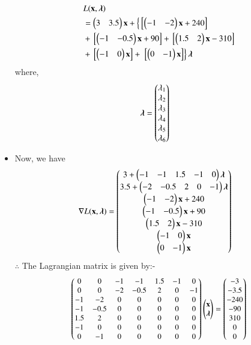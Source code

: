 \begin{itemize}
\begin{equation}
\begin{aligned}
    &L(\mathbf{x},\boldsymbol{\lambda}) \\ &= \begin{pmatrix}3 & 3.5\end{pmatrix}\mathbf{x}+\left\{{}\left[\begin{pmatrix}-1 & -2\end{pmatrix}\mathbf{x}+240\right]\right. \\ &+ {}\left[\begin{pmatrix}-1 & -0.5\end{pmatrix}\mathbf{x}+90\right] +{}\left[\begin{pmatrix}1.5 & 2\end{pmatrix}\mathbf{x}-310\right] \\ &+ {}\left[\begin{pmatrix}-1 & 0\end{pmatrix}\mathbf{x}\right] +\left.{}\left[\begin{pmatrix}0 & -1\end{pmatrix}\mathbf{x}\right]\right\}\boldsymbol{\lambda}
\end{aligned}
\end{equation}
where,
\begin{align}
    \boldsymbol{\lambda} &= \begin{pmatrix}\lambda_1 \\ \lambda_2 \\ \lambda_3 \\ \lambda_4 \\ \lambda_5 \\ \lambda_6\end{pmatrix}
\end{align}
\item Now, we have
\begin{align}
    \nabla L(\mathbf{x},\boldsymbol{\lambda}) &= \begin{pmatrix}3+ \begin{pmatrix}-1 & -1 & 1.5 & -1 & 0 \end{pmatrix}\boldsymbol{\lambda}\\ 3.5+\begin{pmatrix}-2 & -0.5 & 2 & 0 & -1\end{pmatrix}\boldsymbol{\lambda} \\ \begin{pmatrix}-1 & -2\end{pmatrix}\mathbf{x}+240 \\ \begin{pmatrix}-1 & -0.5\end{pmatrix}\mathbf{x}+90 \\ \begin{pmatrix}1.5 & 2\end{pmatrix}\mathbf{x}-310 \\ \begin{pmatrix}-1 & 0\end{pmatrix}\mathbf{x} \\ \begin{pmatrix}0 & -1\end{pmatrix}\mathbf{x}\end{pmatrix}
\end{align}
$\therefore$ The Lagrangian matrix is given by:-
\begin{align}
  \small{\myvec{0 & 0 & -1 & -1 & 1.5 & -1 & 0 \\ 0 & 0 & -2 & -0.5 & 2 & 0 & -1 \\ -1 & -2 & 0 & 0 & 0 & 0 & 0 \\ -1 & -0.5 & 0 & 0 & 0 & 0 & 0 \\ 1.5 & 2 & 0 & 0 & 0 & 0 & 0 \\ -1 & 0 & 0 & 0 & 0 & 0 & 0 \\ 0 & -1 & 0 & 0 & 0 & 0 & 0 }\myvec{\vec{x} \\ \boldsymbol{\lambda} }}= \small{\myvec{-3 \\ -3.5 \\ -240 \\ -90 \\ 310 \\ 0 \\0 }}

\end{align}
\end{itemize}
